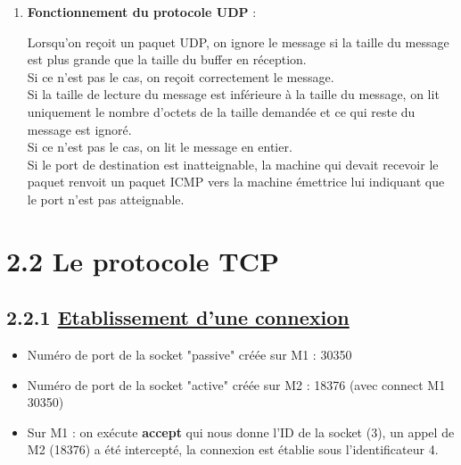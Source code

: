 \documentclass{article}
\begin{document}
\begin{enumerate}[resume]
	\item \textbf{Fonctionnement du protocole UDP} :

Lorsqu'on reçoit un paquet UDP, on ignore le message si la taille du message est plus grande que la taille du buffer en réception.\\

Si ce n'est pas le cas, on reçoit correctement le message.\\

Si la taille de lecture du message est inférieure à la taille du message, on lit uniquement le nombre d'octets de la taille demandée et ce qui reste du message est ignoré.\\

Si ce n'est pas le cas, on lit le message en entier.\\

Si le port de destination est inatteignable, la machine qui devait recevoir le paquet renvoit un paquet ICMP vers la machine émettrice lui indiquant que le port n'est pas atteignable.
\end{enumerate}
	
\section*{2.2 Le protocole TCP}

\subsection*{2.2.1 \underline{Etablissement d'une connexion}}

\begin{itemize}
	\item Numéro de port de la socket "passive" créée sur M1 : 30350
	\item Numéro de port de la socket "active" créée sur M2 : 18376 (avec connect M1 30350)
	\item Sur M1 : on exécute \textbf{accept} qui nous donne l'ID de la socket (3), un appel de M2 (18376) a été intercepté, la connexion est établie sous l'identificateur 4.
\end{itemize}
\end{document}
